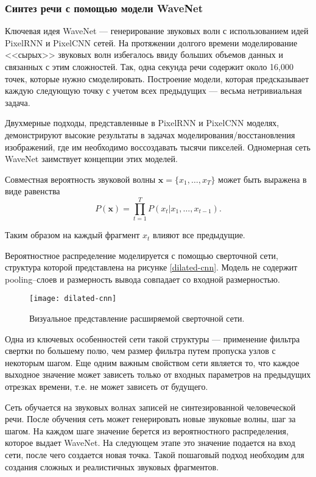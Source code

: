 \subsubsection{Синтез речи с помощью модели WaveNet}
\label{section:wavenet}
Ключевая идея WaveNet --- генерирование звуковых волн с использованием идей PixelRNN \cite{van2016pixel} и PixelCNN\cite{oord2016conditional} сетей. На протяжении долгого времени моделирование <<сырых>> звуковых волн избегалось ввиду больших объемов данных и связанных с этим сложностей. Так, одна секунда речи содержит около 16,000 точек, которые нужно смоделировать. Построение модели, которая предсказывает каждую следующую точку с учетом всех предыдущих --- весьма нетривиальная задача.

Двухмерные подходы, представленные в PixelRNN и PixelCNN моделях, демонстрируют высокие результаты в задачах моделирования/восстановления изображений, где им необходимо воссоздавать тысячи пикселей. Одномерная сеть WaveNet заимствует концепции этих моделей.

Совместная вероятность звуковой волны $\mathbf{x} = \{x_1, \dots, x_T\}$ может быть выражена в виде равенства
$$P(\mathbf{x}) = \prod_{t = 1}^{T} P(x_t | x_1, \dots, x_{t - 1}).$$

Таким образом на каждый фрагмент $x_t$ влияют все предыдущие.

Вероятностное распределение моделируется с помощью сверточной сети, структура которой представлена на рисунке \ref{dilated-cnn}. Модель не содержит pooling--слоев и размерность вывода совпадает со входной размерностью.

\begin{figure}[h]
	\centering
	\texttt{[image: dilated-cnn]}
	\caption{Визуальное представление расширяемой сверточной сети.}
	\label{fig:dilated-cnn}
\end{figure}

Одна из ключевых особенностей сети такой структуры --- применение фильтра свертки по большему полю, чем размер фильтра путем пропуска узлов с некоторым шагом. Еще одним важным свойством сети является то, что каждое выходное значение может зависеть только от входных параметров на предыдущих отрезках времени, т.е. не может зависеть от будущего.

Сеть обучается на звуковых волнах записей не синтезированной человеческой речи. После обучения сеть может генерировать новые звуковые волны, шаг за шагом. На каждом шаге значение берется из вероятностного распределения, которое выдает WaveNet. На следующем этапе это значение подается на вход сети, после чего создается новая точка. Такой пошаговый подход необходим для создания сложных и реалистичных звуковых фрагментов.

